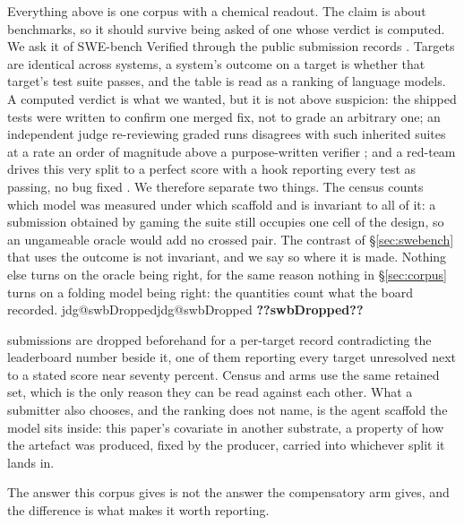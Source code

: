 \documentclass[11pt]{article}
\makeatletter
\newcommand{\jdg}[1]{%
  \ifcsname jdg@#1\endcsname\csname jdg@#1\endcsname
  \else\textbf{??#1??}\PackageError{rna}{undefined measured quantity #1}{}\fi}
\makeatother
\begin{document}
Everything above is one corpus with a chemical readout. The claim is about benchmarks, so it should
survive being asked of one whose verdict is computed. We ask it of SWE-bench Verified
\citep{jimenez2024swebench,swebenchverified2024} through the public submission records
\citep{swebenchexperiments}. Targets are identical across systems, a system's outcome on a target is
whether that target's test suite passes, and the table is read as a ranking of language models.
A computed verdict is what we wanted, but it is not above suspicion: the shipped tests were written
to confirm one merged fix, not to grade an arbitrary one; an independent judge re-reviewing graded
runs disagrees with such inherited suites at a rate an order of magnitude above a purpose-written
verifier \citep{huang2026deepswe}; and a red-team drives this very split to a perfect score with a
hook reporting every test as passing, no bug fixed \citep{wang2026benchjack}. We therefore separate
two things. The census counts which model was measured under which scaffold and is invariant to all
of it: a submission obtained by gaming the suite still occupies one cell of the design, so an
ungameable oracle would add no crossed pair. The contrast of \S\ref{sec:swebench} that uses the
outcome is not invariant, and we say so where it is made. Nothing else turns on the oracle being
right, for the same reason nothing in \S\ref{sec:corpus} turns on a folding model being right: the
quantities count what the board recorded. \jdg{swbDropped} submissions are dropped beforehand for a
per-target record contradicting the leaderboard number beside it, one of them reporting every
target unresolved next to a stated score near seventy percent. Census and arms use the same
retained set, which is the only reason they can be read against each other. What a submitter also
chooses, and the ranking does not name, is the agent scaffold the model sits inside: this paper's
covariate in another substrate, a property of how the artefact was produced, fixed by the producer,
carried into whichever split it lands in.

The answer this corpus gives is not the answer the compensatory arm gives, and the difference is
what makes it worth reporting.
\end{document}
